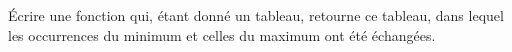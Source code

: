 \exer{}
\setcounter{numques}{0}

Écrire une fonction qui, étant donné un tableau, retourne ce tableau, dans
lequel les occurrences du minimum et celles du maximum ont été échangées.